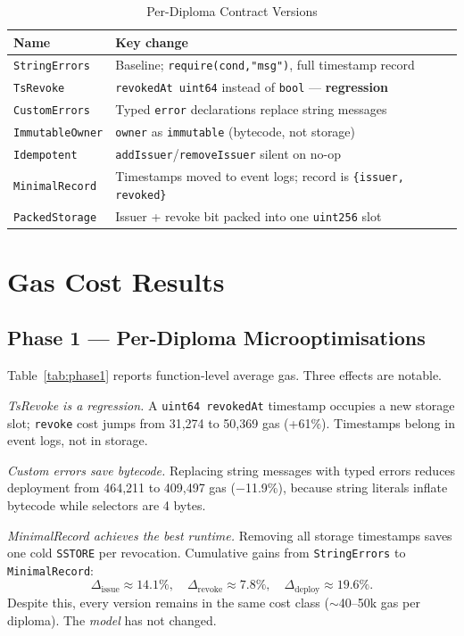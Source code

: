 \documentclass[conference]{IEEEtran}
\begin{document}
\begin{table}[t]
\centering
\caption{Per-Diploma Contract Versions}
\label{tab:versions}
\setlength{\tabcolsep}{4pt}
\begin{tabular}{p{2.1cm} p{5.5cm}}
\toprule
Name & Key change \\
\midrule
\texttt{StringErrors}   & Baseline; \texttt{require(cond,"msg")}, full timestamp record \\
\texttt{TsRevoke}       & \texttt{revokedAt uint64} instead of \texttt{bool} — \textbf{regression} \\
\texttt{CustomErrors}   & Typed \texttt{error} declarations replace string messages \\
\texttt{ImmutableOwner} & \texttt{owner} as \texttt{immutable} (bytecode, not storage) \\
\texttt{Idempotent}     & \texttt{addIssuer}/\texttt{removeIssuer} silent on no-op \\
\texttt{MinimalRecord}  & Timestamps moved to event logs; record is \texttt{\{issuer, revoked\}} \\
\texttt{PackedStorage}  & Issuer + revoke bit packed into one \texttt{uint256} slot \\
\bottomrule
\end{tabular}
\end{table}

\section{Gas Cost Results}

\subsection{Phase 1 — Per-Diploma Microoptimisations}
\label{sec:phase1}

Table~\ref{tab:phase1} reports function-level average gas.
Three effects are notable.

\emph{TsRevoke is a regression.}
A \texttt{uint64 revokedAt} timestamp occupies a new storage slot;
\texttt{revoke} cost jumps from 31,274 to 50,369 gas (+61\%).
Timestamps belong in event logs, not in storage.

\emph{Custom errors save bytecode.}
Replacing string messages with typed errors reduces deployment
from 464,211 to 409,497 gas (−11.9\%), because string literals
inflate bytecode while selectors are 4 bytes.

\emph{MinimalRecord achieves the best runtime.}
Removing all storage timestamps saves one cold \texttt{SSTORE}
per revocation.
Cumulative gains from \texttt{StringErrors} to \texttt{MinimalRecord}:
\begin{equation}
\Delta_\text{issue} \approx 14.1\%,\quad
\Delta_\text{revoke} \approx 7.8\%,\quad
\Delta_\text{deploy} \approx 19.6\%.
\label{eq:p1gains}
\end{equation}
Despite this, every version remains in the same cost class
($\sim$40–50k gas per diploma). The \emph{model} has not changed.
\end{document}

